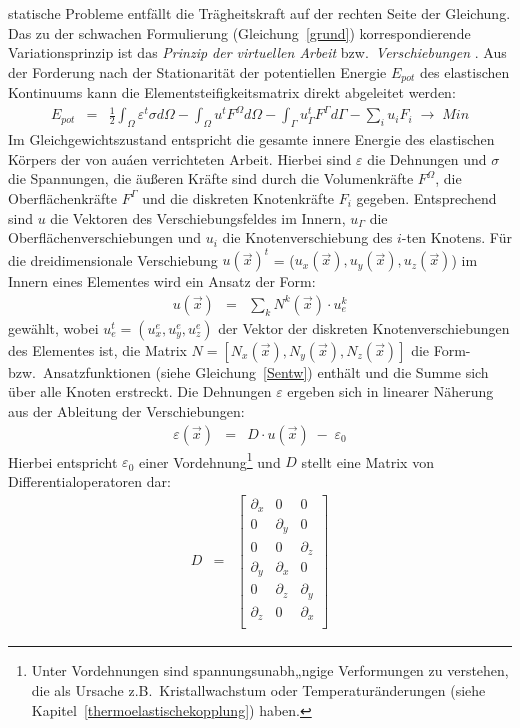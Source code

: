 statische Probleme entfällt die Trägheitskraft auf der rechten Seite der
Gleichung.\\
%
Das zu der schwachen Formulierung (Gleichung~\ref{grund}) korrespondierende
Variationsprinzip ist das {\em Prinzip der virtuellen
Arbeit} bzw.\ {\em Verschiebungen} \cite{Zie84}. Aus der Forderung nach der
Stationarität der potentiellen Energie $E_{pot}$ des elastischen Kontinuums
kann die Elementsteifigkeitsmatrix direkt abgeleitet werden:
\begin{eqnarray}
\label{epot}
 E_{pot} & = & \frac{1}{2} \int_{\Omega} \varepsilon^{t} \sigma d\Omega
           - \int_{\Omega} u^{t} F^{\Omega} d\Omega
           - \int_{\Gamma} u^{t}_{\Gamma} F^{\Gamma} d\Gamma
           - \sum_{i} u_{i} F_{i} \; \rightarrow \; Min
\end{eqnarray}
Im Gleichgewichtszustand entspricht die gesamte innere Energie
des elastischen Körpers der von auáen verrichteten Arbeit.
Hierbei sind $\varepsilon$ die Dehnungen und $\sigma$ die Spannungen,
die äußeren Kräfte sind durch die Volumenkräfte $F^{\Omega}$, die
Oberflächenkräfte $F^{\Gamma}$ und die diskreten Knotenkräfte $F_{i}$
gegeben. Entsprechend sind $u$ die Vektoren des Verschiebungsfeldes im Innern,
$u_{\Gamma}$ die Oberflächenverschiebungen und $u_{i}$ die Knotenverschiebung
des $i$-ten Knotens. Für die dreidimensionale Verschiebung
$u(\vec x)^{t}$ = ($u_x(\vec x), u_y(\vec x), u_z(\vec x)$)
im Innern eines Elementes wird ein Ansatz der Form:
\begin{eqnarray}
\label{uansatz}
 u(\vec x) & = & \sum_{k} N^{k}(\vec x) \cdot u_{e}^{k}
\end{eqnarray}
gewählt, wobei $u_{e}^{t} = (u_x^e, u_y^e, u_z^e)$ der Vektor der diskreten
Knotenverschiebungen des Elementes ist, die Matrix
$N = [N_x(\vec x), N_y(\vec x), N_z(\vec x)]$ die Form- bzw.\
Ansatzfunktionen (siehe Gleichung~\ref{Sentw}) enthält und die Summe sich
über alle Knoten erstreckt.
Die Dehnungen $\varepsilon$ ergeben sich in linearer Näherung aus der
Ableitung der Verschiebungen:
\begin{eqnarray}
\label{elemdehn}
 \varepsilon(\vec x) & = & D \cdot u(\vec x) \; - \; \varepsilon_{0}
\end{eqnarray}
Hierbei entspricht $\varepsilon_{0}$ einer Vordehnung\footnote{Unter
Vordehnungen sind spannungsunabh„ngige Verformungen zu verstehen, die als
Ursache z.B.\ Kristallwachstum oder Temperaturänderungen (siehe
Kapitel~\ref{thermoelastischekopplung}) haben.} und $D$ stellt eine Matrix
von Differentialoperatoren dar:
\begin{eqnarray}
\label{Doperator}
 D & = &
 \left[
        \begin{array}{lll}
         \partial_{x} & 0            & 0 \\
         0            & \partial_{y} & 0 \\
	 0            & 0            & \partial_{z} \\
	 \partial_{y} & \partial_{x} & 0          \\
	 0            & \partial_{z} & \partial_{y} \\
	 \partial_{z} & 0            & \partial_{x} \\
	\end{array}
 \right]
\end{eqnarray}
